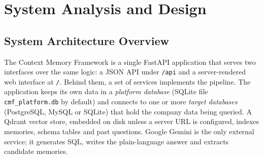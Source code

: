 \chapter{System Analysis and Design}

\section{System Architecture Overview}
The Context Memory Framework is a single FastAPI application that serves two interfaces
over the same logic: a JSON API under \texttt{/api} and a server-rendered web interface at
\texttt{/}. Behind them, a set of services implements the pipeline. The application keeps
its own data in a \textit{platform database} (SQLite file \texttt{cmf\_platform.db} by
default) and connects to one or more \textit{target databases} (PostgreSQL, MySQL or
SQLite) that hold the company data being queried. A Qdrant vector store, embedded on disk
unless a server URL is configured, indexes memories, schema tables and past questions.
Google Gemini is the only external service; it generates SQL, writes the plain-language
answer and extracts candidate memories.

